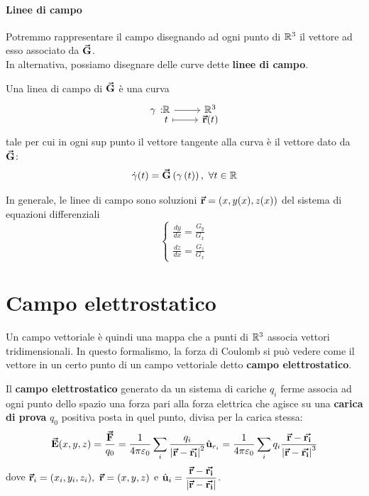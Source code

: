 \paragraph{Linee di campo}
Potremmo rappresentare il campo disegnando ad ogni punto di $\mathbb{R}^3$ il vettore ad esso associato da $\vb*{\va{G}}$.\\
In alternativa, possiamo disegnare delle curve dette \textbf{linee di campo}.
\begin{define}
	Una linea di campo di $\vb*{\va{G}}$ è una curva 
\begin{equation}
	\funztot[\gamma]{\realset}{\realset^3}{t}{\vba{r}(t)}
\end{equation}
tale per cui in ogni sup punto il vettore tangente alla curva è il vettore dato da $\vb*{\va{G}}$:
\begin{equation}
	\dot{\gamma}(t)=\vba{G}\left(\gamma\left(t\right)\right),\ \forall t\in\realset
\end{equation}
\end{define}
In generale, le linee di campo sono soluzioni $\vb*{\va{r}}=\left(x,y(x),z(x)\right)$ del sistema di equazioni differenziali
\begin{equation}
	\begin{cases}
		\frac{dy}{dx}=\frac{G_y}{G_x}\\
		\frac{dz}{dx}=\frac{G_z}{G_x}
	\end{cases}
\end{equation}
\section{Campo elettrostatico}
Un campo vettoriale è quindi una mappa che a punti di $\mathbb{R}^3$ associa vettori tridimensionali.
In questo formalismo, la forza di Coulomb si può vedere come il vettore in un certo punto di un campo vettoriale detto \textbf{campo elettrostatico}.
\begin{define}
	Il \textbf{campo elettrostatico} generato da un sistema di cariche $q_i$ ferme associa ad ogni punto dello spazio una forza pari alla forza elettrica che agisce su una \textbf{carica di prova} $q_0$ positiva posta in quel punto, divisa per la carica stessa:
	\begin{equation}\label{campoelettrostatico}
		\vb*{\va{E}}(x,y,z)=\frac{\vb*{\va{F}}}{q_0}=\frac{1}{4\pi\varepsilon_0}\sum_i \frac{q_i}{\abs{\vb*{\va{r}}-\vb*{\va{r_i}}}^2}\hat{\mathbf{u}}_{r_i}=\frac{1}{4\pi\varepsilon_0}\sum_i q_i\frac{\vb*{\va{r}}-\vb*{\va{r_i}}}{\abs{\vb*{\va{r}}-\vb*{\va{r_i}}}^3}
	\end{equation}
	dove $\vba{r}_i=(x_i,y_i,z_i),\ \vba{r}=(x,y,z)$ e $\hat{\mathbf{u}}_i=\dfrac{\vb*{\va{r}}-\vb*{\va{r_i}}}{\abs{\vb*{\va{r}}-\vb*{\va{r_i}}}}$.
\end{define}
